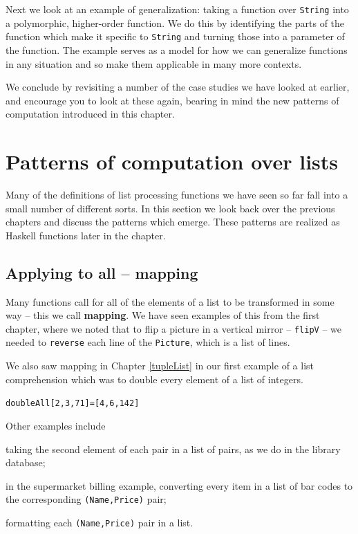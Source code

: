 Next we look at an example of generalization: taking a
function over \texttt{String} into a polymorphic, higher-order function.
We do this by identifying the parts of the function which make it
specific to
\texttt{String} and turning those into a parameter of the function.
The example serves as a model for how we can generalize functions in any situation and so make them applicable in many more contexts.


We conclude by revisiting a number of the case studies we have looked at earlier, and encourage you to look at these again, bearing in mind the new patterns of computation introduced in this chapter.

\begin{webvideos}
\end{webvideos}

\section{Patterns of computation over lists}
\label{defForms}

Many of the definitions of list processing functions we have seen so far
fall into a small number
of different sorts. In this section we look back over the previous chapters and discuss
the patterns which emerge. These patterns are realized as Haskell functions
later in the chapter.

\subsection*{Applying to all -- mapping}

Many functions call for all of the elements of a list to be transformed in some
way -- this we call {\bf mapping}. We have seen examples of this from the first chapter, where
we noted that to flip a picture in a vertical mirror -- \texttt{flipV} -- 
we needed to \texttt{reverse} each line of the \texttt{Picture}, which is a list of lines. 

We also saw mapping in
Chapter \ref{tupleList} in our first example of a list comprehension 
which was to double every element of a list of integers. 
\begin{alltt}
doubleAll [2,3,71] = [4,6,142]
\end{alltt}
Other
examples include
\begin{titemize}
\item taking the second element of each pair in  a list of pairs, as we do in the library
database;
\item in the supermarket billing example, converting every item in a list of bar codes to the corresponding 
\texttt{(Name,Price)} pair;
\item formatting each \texttt{(Name,Price)} pair in a list.
\end{titemize}

